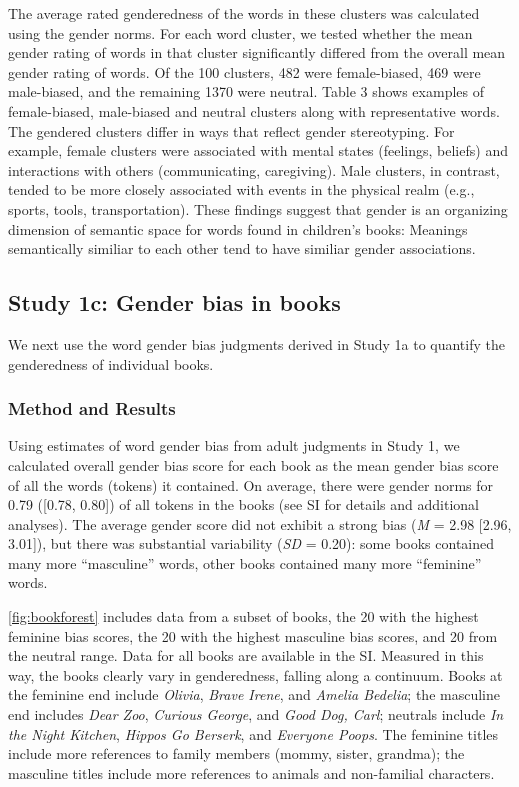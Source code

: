 \documentclass[
  english,
  ,man,floatsintext]{apa6}
\begin{document}
The average rated genderedness of the words in these clusters was calculated using the gender norms. For each word cluster, we tested whether the mean gender rating of words in that cluster significantly differed from the overall mean gender rating of words. Of the 100 clusters, 482 were female-biased, 469 were male-biased, and the remaining 1370 were neutral. Table 3 shows examples of female-biased, male-biased and neutral clusters along with representative words. The gendered clusters differ in ways that reflect gender stereotyping. For example, female clusters were associated with mental states (feelings, beliefs) and interactions with others (communicating, caregiving). Male clusters, in contrast, tended to be more closely associated with events in the physical realm (e.g., sports, tools, transportation). These findings suggest that gender is an organizing dimension of semantic space for words found in children's books: Meanings semantically similiar to each other tend to have similiar gender associations.

\hypertarget{study-1c-gender-bias-in-books}{%
\subsection{Study 1c: Gender bias in books}\label{study-1c-gender-bias-in-books}}

We next use the word gender bias judgments derived in Study 1a to quantify the genderedness of individual books.

\hypertarget{method-and-results-1}{%
\subsubsection{Method and Results}\label{method-and-results-1}}

Using estimates of word gender bias from adult judgments in Study 1, we calculated overall gender bias score for each book as the mean gender bias score of all the words (tokens) it contained. On average, there were gender norms for 0.79 ({[}0.78, 0.80{]}) of all tokens in the books (see SI for details and additional analyses). The average gender score did not exhibit a strong bias (\emph{M} = 2.98 {[}2.96, 3.01{]}), but there was substantial variability (\emph{SD} = 0.20): some books contained many more \enquote{masculine} words, other books contained many more \enquote{feminine} words.

\autoref{fig:bookforest} includes data from a subset of books, the 20 with the highest feminine bias scores, the 20 with the highest masculine bias scores, and 20 from the neutral range. Data for all books are available in the SI. Measured in this way, the books clearly vary in genderedness, falling along a continuum. Books at the feminine end include \emph{Olivia}, \emph{Brave Irene}, and \emph{Amelia Bedelia}; the masculine end includes \emph{Dear Zoo}, \emph{Curious George}, and \emph{Good Dog, Carl}; neutrals include \emph{In the Night Kitchen}, \emph{Hippos Go Berserk}, and \emph{Everyone Poops}. The feminine titles include more references to family members (mommy, sister, grandma); the masculine titles include more references to animals and non-familial characters.
\end{document}
